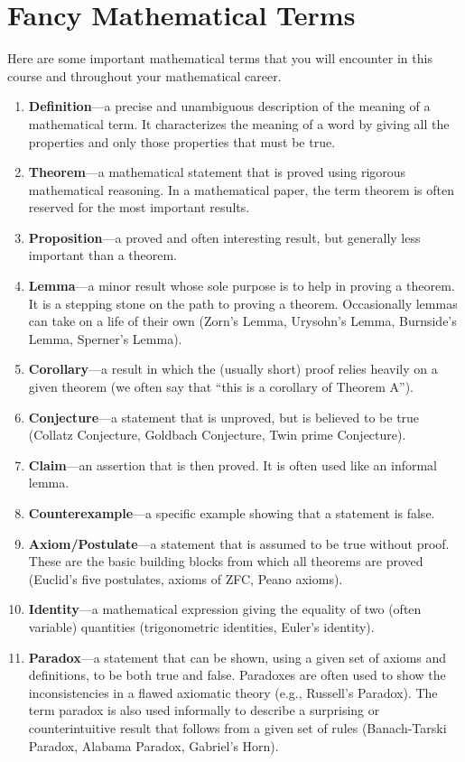 \chapter{Fancy Mathematical Terms}
\label{appendix:fancy_math_terms}

Here are some important mathematical terms that you will encounter in this course and throughout your mathematical career.

\begin{enumerate}
\item \textbf{Definition}---a precise and unambiguous description of the meaning of a mathematical term.  It characterizes the meaning of a word by giving all the properties and only those properties that must be true.
\item \textbf{Theorem}---a mathematical statement that is proved using rigorous mathematical reasoning.  In a mathematical paper, the term theorem is often reserved for the most important results.
\item \textbf{Proposition}---a proved and often interesting result, but generally less important than a theorem.
\item \textbf{Lemma}---a minor result whose sole purpose is to help in proving a theorem.  It is a stepping stone on the path to proving a theorem. Occasionally lemmas can take on a life of their own (Zorn's Lemma, Urysohn's Lemma, Burnside's Lemma, Sperner's Lemma).
\item \textbf{Corollary}---a result in which the (usually short) proof relies heavily on a given theorem (we often say that ``this is a corollary of Theorem A'').
\item \textbf{Conjecture}---a statement that is unproved, but is believed to be true (Collatz Conjecture, Goldbach Conjecture, Twin prime Conjecture).
\item \textbf{Claim}---an assertion that is then proved.  It is often used like an informal lemma.
\item \textbf{Counterexample}---a specific example showing that a statement is false.
\item \textbf{Axiom/Postulate}---a statement that is assumed to be true without proof. These are the basic building blocks from which all theorems are proved (Euclid's five postulates, axioms of ZFC, Peano axioms).
\item \textbf{Identity}---a mathematical expression giving the equality of two (often variable) quantities (trigonometric identities, Euler's identity).
\item \textbf{Paradox}---a statement that can be shown, using a given set of axioms and definitions, to be both true and false. Paradoxes are often used to show the inconsistencies in a flawed axiomatic theory (e.g., Russell's Paradox).  The term paradox is also used informally to describe a surprising or counterintuitive result that follows from a given set of rules (Banach-Tarski Paradox, Alabama Paradox, Gabriel's Horn).
\end{enumerate}